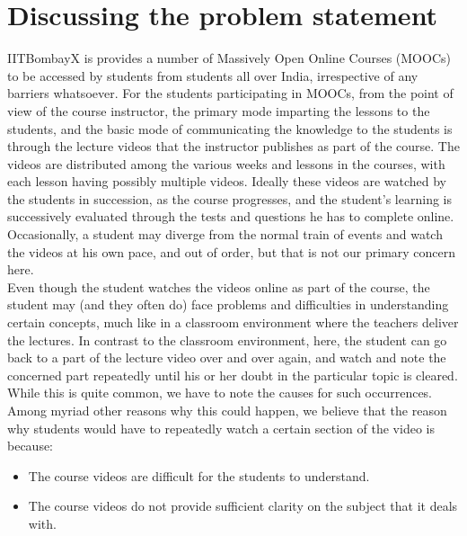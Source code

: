 \documentclass[16pt]{report}
\begin{document}
\section{Discussing the problem statement}

IITBombayX is provides a number of Massively Open Online Courses (MOOCs) to be accessed by students from students all over India, irrespective of any barriers whatsoever. For the students participating in MOOCs, from the point of view of the course instructor, the primary mode imparting the lessons to the students, and the basic mode of communicating the knowledge to the students is through the lecture videos that the instructor publishes as part of the course. The videos are distributed among the various weeks and lessons in the courses, with each lesson having possibly multiple videos. Ideally these videos are watched by the students in succession, as the course progresses, and the student's learning is successively evaluated through the tests and questions he has to complete online. Occasionally, a student may diverge from the normal train of events and watch the videos at his own pace, and out of order, but that is not our primary concern here.\\

Even though the student watches the videos online as part of the course, the student may (and they often do) face problems and difficulties in understanding certain concepts, much like in a classroom environment where the teachers deliver the lectures. In contrast to the classroom environment, here, the student can go back to a part of the lecture video over and over again, and watch and note the concerned part repeatedly until his or her doubt in the particular topic is cleared. While this is quite common, we have to note the causes for such occurrences. Among myriad other reasons why this could happen, we believe that the reason why students would have to repeatedly watch a certain section of the video is because: 

\begin{itemize}

\item The course videos are difficult for the students to understand. 
\item The course videos do not provide sufficient clarity on the subject that it deals with.

\end{itemize}
\end{document}
